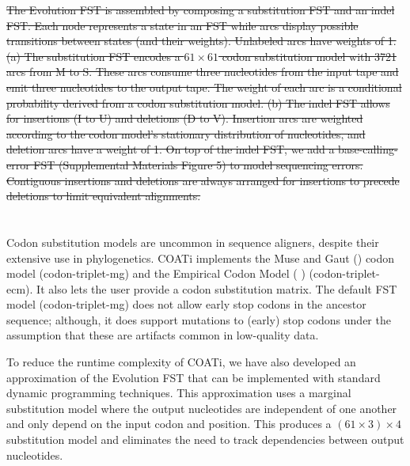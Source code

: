 \documentclass[12pt,letterpaper]{article}
\renewcommand{\cite}[1]{\citeauthor{#1} \citeyear{#1}}
\newcommand{\citembe}[1]{(\cite{#1})}
\providecommand{\DIFaddtex}[1]{{\protect\color{blue}\uwave{#1}}} %
\providecommand{\DIFdeltex}[1]{{\protect\color{red}\sout{#1}}}                      %
\providecommand{\DIFaddbegin}{} %
\providecommand{\DIFaddend}{} %
\providecommand{\DIFdelbegin}{} %
\providecommand{\DIFdelend}{} %
\providecommand{\DIFdelFL}[1]{\DIFdel{#1}} %
\providecommand{\DIFadd}[1]{\texorpdfstring{\DIFaddtex{#1}}{#1}} %
\providecommand{\DIFdel}[1]{\texorpdfstring{\DIFdeltex{#1}}{}} %
\newcommand{\DIFscaledelfig}{0.5}
\newlength{\DIFdelgraphicswidth} %
\newlength{\DIFdelgraphicsheight} %
\newcommand{\DIFaddincludegraphics}[2][]{{\color{blue}\fbox{\DIFOincludegraphics[#1]{#2}}}} %
\newcommand{\DIFdelincludegraphics}[2][]{%
\sbox{\DIFdelgraphicsbox}{\DIFOincludegraphics[#1]{#2}}%
\settoboxwidth{\DIFdelgraphicswidth}{\DIFdelgraphicsbox} %
\settoboxtotalheight{\DIFdelgraphicsheight}{\DIFdelgraphicsbox} %
\scalebox{\DIFscaledelfig}{%
\parbox[b]{\DIFdelgraphicswidth}{\usebox{\DIFdelgraphicsbox}\\[-\baselineskip] \rule{\DIFdelgraphicswidth}{0em}}\llap{\resizebox{\DIFdelgraphicswidth}{\DIFdelgraphicsheight}{%
\setlength{\unitlength}{\DIFdelgraphicswidth}%
\begin{picture}(1,1)%
\thicklines\linethickness{2pt} %
{\color[rgb]{1,0,0}\put(0,0){\framebox(1,1){}}}%
{\color[rgb]{1,0,0}\put(0,0){\line( 1,1){1}}}%
{\color[rgb]{1,0,0}\put(0,1){\line(1,-1){1}}}%
\end{picture}%
}\hspace*{3pt}}} %
} %
\DeclareRobustCommand{\DIFaddbegin}{\DIFOaddbegin \let\includegraphics\DIFaddincludegraphics} %
\DeclareRobustCommand{\DIFaddend}{\DIFOaddend \let\includegraphics\DIFOincludegraphics} %
\DeclareRobustCommand{\DIFdelbegin}{\DIFOdelbegin \let\includegraphics\DIFdelincludegraphics} %
\DeclareRobustCommand{\DIFdelend}{\DIFOaddend \let\includegraphics\DIFOincludegraphics} %
\begin{document}
\DIFdelbegin %
{%
\DIFdelFL{The Evolution FST is assembled by composing a substitution FST and an indel FST.
Each node represents a state in an FST while arcs display possible transitions between states (and their weights). Unlabeled arcs have weights of 1.
(a) The substitution FST encodes a $61 \times 61 $ codon substitution model with 3721 arcs from M to S. These arcs consume three nucleotides from the input tape and emit three nucleotides to the output tape. The weight of each arc is a conditional probability derived from a codon substitution model.
(b) The indel FST allows for insertions (I to U) and deletions (D to V). Insertion arcs are weighted according to the codon model's stationary distribution of nucleotides, and deletion arcs have a weight of 1. On top of the indel FST, we add a base-calling-error FST (Supplemental Materials Figure 5) to model sequencing errors. Contiguous insertions and deletions are always arranged for insertions to precede deletions to limit equivalent alignments.}}
\DIFdelend \DIFaddbegin \section*{\DIFadd{Codon Substitution Models}}
\DIFaddend 

Codon substitution models are uncommon in sequence aligners, despite their extensive use in phylogenetics.
COATi implements the Muse and Gaut (\citeyear{muse_gaut_1994}) codon model (codon-triplet-mg) and the Empirical Codon Model \citembe{kosiol_ECM_2007} (codon-triplet-ecm).
It also lets the user provide a codon substitution matrix.
The default FST model (codon-triplet-mg) does not allow early stop codons in the ancestor sequence; although, it does support mutations to (early) stop codons under the assumption that these are artifacts common in low-quality data.

To reduce the runtime complexity of COATi, we have also developed an approximation of the Evolution FST that can be implemented with standard dynamic programming techniques. This approximation uses a marginal substitution model where the output nucleotides are independent of one another and only depend on the input codon and position. This produces a $\left(61 \times 3 \right) \times 4$ substitution model and eliminates the need to track dependencies between output nucleotides.
\end{document}
